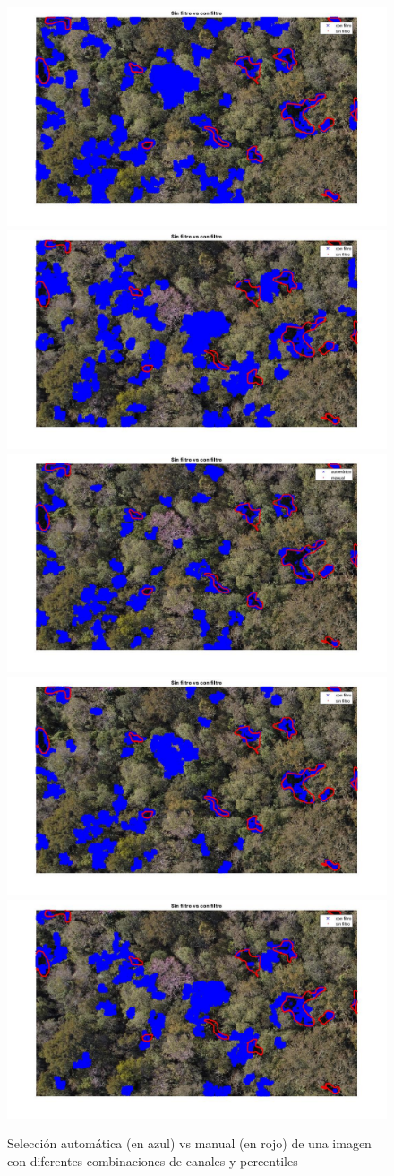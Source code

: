 \begin{figure}
    \includegraphics[width=.3\textwidth]{Imagenes/IIC/p85/BG/260a.jpg}\hfill
    \includegraphics[width=.3\textwidth]{Imagenes/IIC/p85/GR/260a.jpg}\hfill
    \\[\smallskipamount]
    \includegraphics[width=.3\textwidth]{Imagenes/IIC/p90/BR/260a.jpg}\hfill
    \includegraphics[width=.3\textwidth]{Imagenes/IIC/p90/BG/260a.jpg}\hfill
    \includegraphics[width=.3\textwidth]{Imagenes/IIC/p90/GR/260a.jpg}\hfill
    
    \caption{Selección automática (en azul) vs manual (en rojo) de una imagen con diferentes combinaciones de canales y percentiles}\label{fig:dji180}
\end{figure}\label{dji260}

